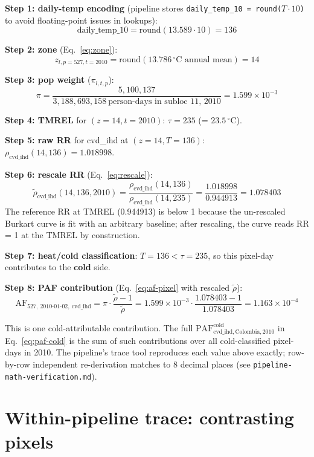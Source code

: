 \documentclass[11pt]{article}
\newcommand{\PAF}{\text{PAF}}
\begin{document}
\textbf{Step 1: daily-temp encoding} (pipeline stores
\texttt{daily\_temp\_10 = round($T \cdot 10$)} to avoid floating-point
issues in lookups):
\[
\text{daily\_temp\_10} = \text{round}(13.589 \cdot 10) = 136
\]

\textbf{Step 2: zone} (Eq.~\ref{eq:zone}):
\[
z_{l, p=527, t=2010} = \text{round}(13.786\,^{\circ}\text{C annual mean}) = 14
\]

\textbf{Step 3: pop weight} ($\pi_{l,t,p}$):
\[
\pi = \frac{5{,}100{,}137}{3{,}188{,}693{,}158\ \text{person-days in subloc 11, 2010}} = 1.599 \times 10^{-3}
\]

\textbf{Step 4: TMREL} for $(z=14, t=2010)$:
$\tau = 235$ (= $23.5\,^{\circ}$C).

\textbf{Step 5: raw RR} for cvd\_ihd at $(z=14, T=136)$:
$\rho_{\text{cvd\_ihd}}(14, 136) = 1.018998$.

\textbf{Step 6: rescale RR} (Eq.~\ref{eq:rescale}):
\[
\tilde\rho_{\text{cvd\_ihd}}(14, 136, 2010)
= \frac{\rho_{\text{cvd\_ihd}}(14, 136)}{\rho_{\text{cvd\_ihd}}(14, 235)}
= \frac{1.018998}{0.944913}
= 1.078403
\]
The reference RR at TMREL (0.944913) is below 1 because the un-rescaled
Burkart curve is fit with an arbitrary baseline; after rescaling, the
curve reads RR = 1 at the TMREL by construction.

\textbf{Step 7: heat/cold classification}: $T = 136 < \tau = 235$, so
this pixel-day contributes to the \textbf{cold} side.

\textbf{Step 8: PAF contribution} (Eq.~\ref{eq:af-pixel} with rescaled
$\tilde\rho$):
\[
\text{AF}_{527,\ \text{2010-01-02},\ \text{cvd\_ihd}}
= \pi \cdot \frac{\tilde\rho - 1}{\tilde\rho}
= 1.599\!\times\!10^{-3} \cdot \frac{1.078403 - 1}{1.078403}
= 1.163 \times 10^{-4}
\]

This is one cold-attributable contribution. The full
$\PAF^{\text{cold}}_{\text{cvd\_ihd}, \text{Colombia}, 2010}$ in
Eq.~\eqref{eq:paf-cold} is the sum of such contributions over all
cold-classified pixel-days in 2010. The pipeline's trace tool reproduces
each value above exactly; row-by-row independent re-derivation matches
to 8 decimal places (see
\texttt{pipeline-math-verification.md}).

\section{Within-pipeline trace: contrasting pixels}
\label{sec:trace-contrasting}
\end{document}
